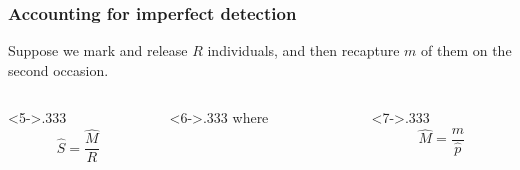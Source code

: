 \documentclass[color=usenames,dvipsnames]{beamer}\usepackage[]{graphicx}\usepackage[]{color}
\begin{document}
\begin{frame}
  \frametitle{Accounting for imperfect detection}
  Suppose we mark and release $R$ individuals, and then
    recapture $m$ of them on the second occasion. \par
    \vfill
    \vfill
    \vspace{-12pt}
    \vfill
  \begin{columns}
    \begin{column}<5->{.333\textheight}
      \[ %
      \hat{S} = \frac{\hat{M}}{R}
      \]
    \end{column}
    \begin{column}<6->{.333\textheight}
      \centering where \par
    \end{column}
    \begin{column}<7->{.333\textheight}
      \[ %
      \hat{M} = \frac{m}{\hat{p}}
      \]
    \end{column}
  \end{columns}
\end{frame}
\end{document}
